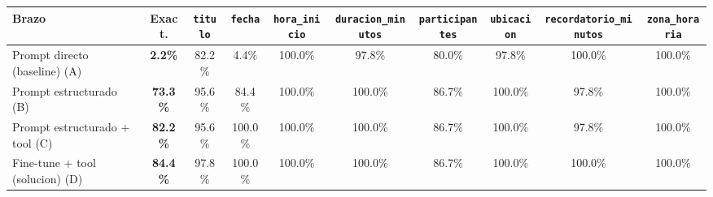 \begin{center}
\scriptsize
\begin{tabular}{@{}lccccccccc@{}}
\toprule
Brazo & Exact. & \texttt{titulo} & \texttt{fecha} & \texttt{hora\_inicio} & \texttt{duracion\_minutos} & \texttt{participantes} & \texttt{ubicacion} & \texttt{recordatorio\_minutos} & \texttt{zona\_horaria} \\
\midrule
Prompt directo (baseline) (A) & \textbf{2.2\%} & 82.2\% & 4.4\% & 100.0\% & 97.8\% & 80.0\% & 97.8\% & 100.0\% & 100.0\% \\
Prompt estructurado (B) & \textbf{73.3\%} & 95.6\% & 84.4\% & 100.0\% & 100.0\% & 86.7\% & 100.0\% & 97.8\% & 100.0\% \\
Prompt estructurado + tool (C) & \textbf{82.2\%} & 95.6\% & 100.0\% & 100.0\% & 100.0\% & 86.7\% & 100.0\% & 97.8\% & 100.0\% \\
Fine-tune + tool (solucion) (D) & \textbf{84.4\%} & 97.8\% & 100.0\% & 100.0\% & 100.0\% & 86.7\% & 100.0\% & 100.0\% & 100.0\% \\
\bottomrule
\end{tabular}
\end{center}

